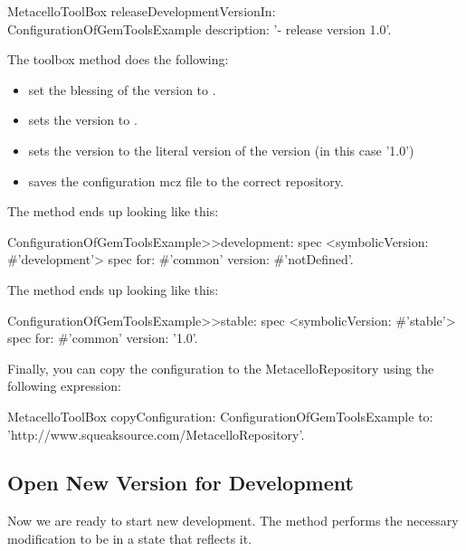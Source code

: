 \documentclass[a4paper,10pt,twoside]{book}
\begin{document}
\begin{code}{}
\begin{code}{}
\begin{code}{}
  MetacelloToolBox
     releaseDevelopmentVersionIn: ConfigurationOfGemToolsExample
     description: '- release version 1.0'.
\end{code}     

The toolbox method  does the following:
\begin{itemize}
\item set the blessing of the  version to .
\item sets the  version to .
\item sets the  version to the literal version of the  version (in this case '1.0')
\item saves the configuration mcz file to the correct repository.
\end{itemize}


The  method ends up looking like this:

\begin{code}{}
ConfigurationOfGemToolsExample>>development: spec
  <symbolicVersion: #'development'>
  spec for: #'common' version: #'notDefined'.
\end{code}  
  
The  method ends up looking like this:

\begin{code}{}
ConfigurationOfGemToolsExample>>stable: spec
  <symbolicVersion: #'stable'>
  spec for: #'common' version: '1.0'.
\end{code}  
  
Finally, you can copy the configuration to the MetacelloRepository using the following expression:

\begin{code}{}
  MetacelloToolBox
     copyConfiguration: ConfigurationOfGemToolsExample
     to: 'http://www.squeaksource.com/MetacelloRepository'.
\end{code}


\subsection{Open New Version for Development}

Now we are ready to start new development. The method 
performs the necessary modification to be in a state that reflects it. 



\end{code}
\end{code}
\end{document}
